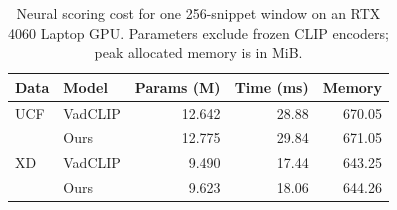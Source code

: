 \begin{table}[t]
\centering
\caption{Neural scoring cost for one 256-snippet window on an RTX 4060 Laptop GPU. Parameters exclude frozen CLIP encoders; peak allocated memory is in MiB.}
\label{tab:complexity}
\small\setlength{\tabcolsep}{3pt}
\begin{tabular}{llrrr}\toprule
Data & Model & Params (M) & Time (ms) & Memory\\\midrule
UCF & VadCLIP & 12.642 & 28.88 & 670.05 \\
 & Ours & 12.775 & 29.84 & 671.05 \\
XD & VadCLIP & 9.490 & 17.44 & 643.25 \\
 & Ours & 9.623 & 18.06 & 644.26 \\
\bottomrule\end{tabular}\end{table}
